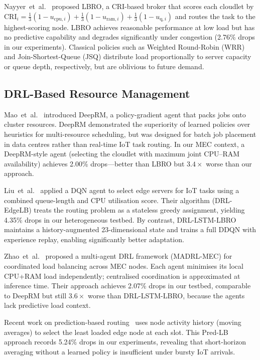 \documentclass[conference]{IEEEtran}
\begin{document}
Nayyer~et~al.~\cite{nayyer2022lbro} proposed LBRO, a CRI-based broker
that scores each cloudlet by
$\text{CRI}_i = \tfrac{1}{3}(1-u_{\text{cpu},i}) + \tfrac{1}{3}(1-u_{\text{ram},i}) + \tfrac{1}{3}(1-u_{\text{q},i})$
and routes the task to the highest-scoring node. LBRO achieves
reasonable performance at low load but has no predictive capability and
degrades significantly under congestion (2.76\% drops in our
experiments). Classical policies such as Weighted Round-Robin (WRR) and
Join-Shortest-Queue (JSQ) distribute load proportionally to server
capacity or queue depth, respectively, but are oblivious to future
demand.

\subsection{DRL-Based Resource Management}

Mao~et~al.~\cite{mao2016resource} introduced DeepRM, a policy-gradient
agent that packs jobs onto cluster resources. DeepRM demonstrated the
superiority of learned policies over heuristics for multi-resource
scheduling, but was designed for batch job placement in data centres
rather than real-time IoT task routing. In our MEC context, a DeepRM-style
agent (selecting the cloudlet with maximum joint CPU--RAM availability)
achieves 2.00\% drops—better than LBRO but $3.4\times$ worse than our
approach.

Liu~et~al.~\cite{liu2022edgelb} applied a DQN agent to select edge
servers for IoT tasks using a combined queue-length and CPU utilisation
score. Their algorithm (DRL-EdgeLB) treats the routing problem as a
stateless greedy assignment, yielding 4.35\% drops in our heterogeneous
testbed. By contrast, DRL-LSTM-LBRO maintains a history-augmented
23-dimensional state and trains a full DDQN with experience replay,
enabling significantly better adaptation.

Zhao~et~al.~\cite{zhao2022madrl} proposed a multi-agent DRL framework
(MADRL-MEC) for coordinated load balancing across MEC nodes. Each agent
minimises its local CPU+RAM load independently; centralised coordination
is approximated at inference time. Their approach achieves 2.07\% drops
in our testbed, comparable to DeepRM but still $3.6\times$ worse than
DRL-LSTM-LBRO, because the agents lack predictive load context.

Recent work on prediction-based routing~\cite{predlb2025} uses node
activity history (moving averages) to select the least loaded edge node
at each slot. This Pred-LB approach records 5.24\% drops in our
experiments, revealing that short-horizon averaging without a learned
policy is insufficient under bursty IoT arrivals.
\end{document}
